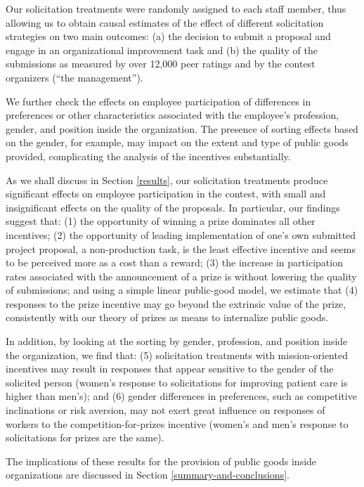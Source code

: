\documentclass[12pt, titlepage]{article}
\begin{document}
Our solicitation treatments were randomly assigned to each staff member,
thus allowing us to obtain causal estimates of the effect of different
solicitation strategies on two main outcomes: (a) the decision to submit
a proposal and engage in an organizational improvement task and (b) the
quality of the submissions as measured by over 12,000 peer ratings and
by the contest organizers (``the management'').

We further check the effects on employee participation of differences in
preferences or other characteristics associated with the employee's
profession, gender, and position inside the organization. The presence
of sorting effects based on the gender, for example, may impact on the
extent and type of public goods provided, complicating the analysis of
the incentives substantially.

As we shall discuss in Section \ref{results}, our solicitation
treatments produce significant effects on employee participation in the
contest, with small and insignificant effects on the quality of the
proposals. In particular, our findings suggest that: (1) the opportunity
of winning a prize dominates all other incentives; (2) the opportunity
of leading implementation of one's own submitted project proposal, a
non-production task, is the least effective incentive and seems to be
perceived more as a cost than a reward; (3) the increase in
participation rates associated with the announcement of a prize is
without lowering the quality of submissions; and using a simple linear
public-good model, we estimate that (4) responses to the prize incentive
may go beyond the extrinsic value of the prize, consistently with our
theory of prizes as means to internalize public goods.

In addition, by looking at the sorting by gender, profession, and
position inside the organization, we find that: (5) solicitation
treatments with mission-oriented incentives may result in responses that
appear sensitive to the gender of the solicited person (women's response
to solicitations for improving patient care is higher than men's); and
(6) gender differences in preferences, such as competitive inclinations
or risk aversion, may not exert great influence on responses of workers
to the competition-for-prizes incentive (women's and men's response to
solicitations for prizes are the same).

The implications of these results for the provision of public goods
inside organizations are discussed in Section
\ref{summary-and-conclusions}.
\end{document}
